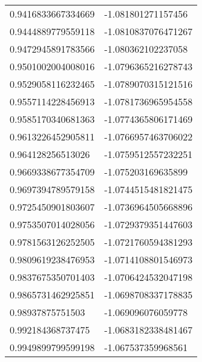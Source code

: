 \begin{supertabular}{ll}
0.9416833667334669  & -1.081801271157456    \\
0.9444889779559118  & -1.0810837076471267   \\
0.9472945891783566  & -1.080362102237058    \\
0.9501002004008016  & -1.0796365216278743   \\
0.9529058116232465  & -1.0789070315121516   \\
0.9557114228456913  & -1.0781736965954558   \\
0.9585170340681363  & -1.0774365806171469   \\
0.9613226452905811  & -1.0766957463706022   \\
0.964128256513026   & -1.0759512557232251   \\
0.9669338677354709  & -1.075203169635899    \\
0.9697394789579158  & -1.0744515481821475   \\
0.9725450901803607  & -1.0736964505668896   \\
0.9753507014028056  & -1.0729379351447603   \\
0.9781563126252505  & -1.0721760594381293   \\
0.9809619238476953  & -1.0714108801546973   \\
0.9837675350701403  & -1.0706424532047198   \\
0.9865731462925851  & -1.0698708337178835   \\
0.98937875751503    & -1.069096076059778    \\
0.992184368737475   & -1.0683182338481467   \\
0.9949899799599198  & -1.067537359968561    \\
\end{supertabular}
